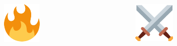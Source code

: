 \documentclass{beamer}
\begin{document}
    \begin{frame}
        \begin{columns}
            \begin{column}{.3\textwidth}
                \centering
                \includegraphics[width=.95\textwidth]{./static/fire_twemoji.pdf}
            \end{column}

            \begin{column}{.3\textwidth}
                \centering
                \includegraphics[width=.95\textwidth]{./static/sword_twemoji.pdf}
            \end{column}


\end{columns}
\end{frame}
\end{document}
